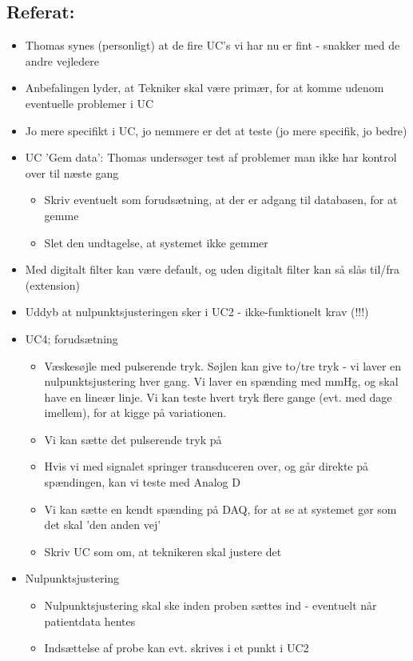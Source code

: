 \documentclass[a4paper,11pt,oneside]{memoir}
\begin{document}
\subsection{Referat:}
\begin{itemize}
\item Thomas synes (personligt) at de fire UC's vi har nu er fint - snakker med de andre vejledere
\item Anbefalingen lyder, at Tekniker skal være primær, for at komme udenom eventuelle problemer i UC
\item Jo mere specifikt i UC, jo nemmere er det at teste (jo mere specifik, jo bedre)
\item UC 'Gem data': Thomas undersøger test af problemer man ikke har kontrol over til næste gang
\begin{itemize}
\item Skriv eventuelt som forudsætning, at der er adgang til databasen, for at gemme
\item Slet den undtagelse, at systemet ikke gemmer 
\end{itemize}
\item Med digitalt filter kan være default, og uden digitalt filter kan så slås til/fra (extension)
\item Uddyb at nulpunktsjusteringen sker i UC2 - ikke-funktionelt krav (!!!) 
\item UC4; forudsætning
\begin{itemize}
\item Væskesøjle med pulserende tryk. Søjlen kan give to/tre tryk - vi laver en nulpunktsjustering hver gang. Vi laver en spænding med mmHg, og skal have en lineær linje. Vi kan teste hvert tryk flere gange (evt. med dage imellem), for at kigge på variationen.
\item Vi kan sætte det pulserende tryk på
\item Hvis vi med signalet springer transduceren over, og går direkte på spændingen, kan vi teste med Analog D
\item Vi kan sætte en kendt spænding på DAQ, for at se at systemet gør som det skal 'den anden vej'
\item Skriv UC som om, at teknikeren skal justere det 
\end{itemize}
\item Nulpunktsjustering
\begin{itemize}
\item Nulpunktsjustering skal ske inden proben sættes ind - eventuelt når patientdata hentes 
\item Indsættelse af probe kan evt. skrives i et punkt i UC2

\end{itemize}
\end{itemize}
\end{document}
